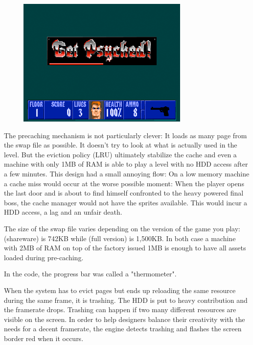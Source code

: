\documentclass[book.tex]{subfiles}
\begin{document}
\begin{figure}[H]
\centering
 \includegraphics[width=\textwidth]{screenshots/get_psyched.png}
 \end{figure}
 \par
The precaching mechanism is not particularly clever: It loads as many page from the swap file as possible. It doesn't try to look at what is actually used in the level. But the eviction policy (LRU) ultimately stabilize the cache and even a machine with only 1MB of RAM is able to play a level with no HDD access after a few minutes. This design had a small annoying flow: On a low memory machine a cache miss would occur at the worse possible moment: When the player opens the last door and is about to find himself confronted to the heavy powered final boss, the cache manager would not have the sprites available. This would incur a HDD access, a lag and an unfair death.\\
\par
The size of the swap file varies depending on the version of the game you play:  (shareware) is 742KB while  (full version) is 1,500KB. In both case a machine with 2MB of RAM on top of the factory issued 1MB is enough to have all assets loaded during pre-caching.\\
\par
{} In the code, the progress bar was called a "thermometer".\\
\par
{} When the system has to evict pages but ends up reloading the same resource during the same frame, it is trashing. The HDD is put to heavy contribution and the framerate drops. Trashing can happen if two many different resources are visible on the screen. In order to help designers balance their creativity with the needs for a decent framerate, the engine detects trashing and flashes the screen border red when it occurs.\\
\end{document}
